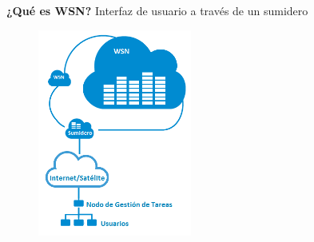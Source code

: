 \documentclass[aspectratio=43, handout]{beamer}
\begin{document}
\begin{frame}{\textbf{\LARGE{¿Qué es WSN?}}}
\fontsize{15pt}{15}\selectfont
		\noindent Interfaz de usuario a través de un sumidero
		\begin{figure}[H]			
		\includegraphics[width=0.45\textwidth]{./imagenes/RedDistribuida.png}
		\end{figure}	  	  	
\end{frame}
\end{document}
